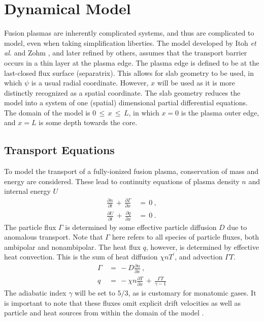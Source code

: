 \chapter{Dynamical Model}\label{chapter:dynamical_model}
Fusion plasmas are inherently complicated systems, and thus are complicated to model, even when taking simplification liberties.
The model developed by Itoh \emph{et al.} \cite{itoh_edge_1991} and Zohm \cite{zohm_dynamic_1994}, and later refined by others, assumes that the transport barrier occurs in a thin layer at the plasma edge.
The plasma edge is defined to be at the last-closed flux surface (separatrix).
This allows for slab geometry to be used, in which $\psi$ is a usual radial coordinate.
However, $x$ will be used as it is more distinctly recognized as a spatial coordinate.
The slab geometry reduces the model into a system of one (spatial) dimensional partial differential equations.
The domain of the model is $0 \,\leq\, x \,\leq\, L$, in which $x = 0$ is the plasma outer edge, and $x = L$ is some depth towards the core.

\section{Transport Equations}\label{sec:transport_eqs}
To model the transport of a fully-ionized fusion plasma, conservation of mass and energy are considered.
These lead to continuity equations of plasma density $n$ and internal energy $U$
\begin{align} %
	\frac{\partial n}{\partial t} \,+\, \frac{\partial \Gamma}{\partial x} \,&=\, 0~,\label{eq:n_continuity} \\
	\frac{\partial U}{\partial t} \,+\, \frac{\partial q}{\partial x} \,&=\, 0\label{eq:U_continuity}~.
\end{align}
The particle flux $\Gamma$ is determined by some effective particle diffusion $D$ due to anomalous transport.
Note that $\Gamma$ here refers to all species of particle fluxes, both ambipolar and nonambipolar.
The heat flux $q$, however, is determined by effective heat convection.
This is the sum of heat diffusion $\chi n T^\prime$, and advection $\Gamma T$.
\begin{align} %
	\Gamma \,&=\, -D \frac{\partial n}{\partial x}~,\label{eq:particle_flux} \\
	q \,&=\, -\chi n \frac{\partial T}{\partial x} \,+\, \frac{\Gamma T}{\gamma - 1} \label{eq:heat_flux}
\end{align}
The adiabatic index $\gamma$ will be set to $5/3$, as is customary for monatomic gases.
It is important to note that these fluxes omit explicit drift velocities as well as particle and heat sources from within the domain of the model \cite{zohm_dynamic_1994}.

